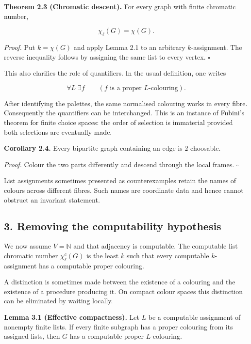 \documentclass[11pt,letterpaper]{article}
\let\oldsubsection\subsection
\renewcommand{\subsection}{\Needspace{8\baselineskip}\oldsubsection}
\begin{document}
\textbf{Theorem 2.3 (Chromatic descent).} For every graph with finite chromatic number,

\[
\chi_\ell(G)=\chi(G).
\]

\emph{Proof.} Put \(k=\chi(G)\) and apply Lemma 2.1 to an arbitrary \(k\)-assignment. The reverse inequality follows by assigning the same list to every vertex. \(\square\)

This also clarifies the role of quantifiers. In the usual definition, one writes

\[
\forall L\;\exists f\qquad(f\text{ is a proper }L\text{-colouring}).
\]

After identifying the palettes, the same normalised colouring works in every fibre. Consequently the quantifiers can be interchanged. This is an instance of Fubini's theorem for finite choice spaces: the order of selection is immaterial provided both selections are eventually made.

\textbf{Corollary 2.4.} Every bipartite graph containing an edge is \(2\)-choosable.

\emph{Proof.} Colour the two parts differently and descend through the local frames. \(\square\)

List assignments sometimes presented as counterexamples retain the names of colours across different fibres. Such names are coordinate data and hence cannot obstruct an invariant statement.

\subsection{3. Removing the computability hypothesis}\label{removing-the-computability-hypothesis}

We now assume \(V=\mathbb N\) and that adjacency is computable. The computable list chromatic number \(\chi^c_\ell(G)\) is the least \(k\) such that every computable \(k\)-assignment has a computable proper colouring.

A distinction is sometimes made between the existence of a colouring and the existence of a procedure producing it. On compact colour spaces this distinction can be eliminated by waiting locally.

\textbf{Lemma 3.1 (Effective compactness).} Let \(L\) be a computable assignment of nonempty finite lists. If every finite subgraph has a proper colouring from its assigned lists, then \(G\) has a computable proper \(L\)-colouring.
\end{document}
